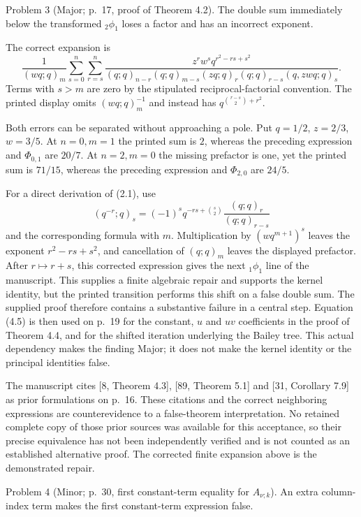 \documentclass[10pt]{article}
\begin{document}
Problem 3 (Major; p. 17, proof of Theorem 4.2).  The double sum immediately below the transformed \({}_2\phi_1\) loses a factor and has an incorrect exponent.\par
The correct expansion is \[\frac1{(wq;q)_m}
 \sum_{s=0}^n\sum_{r=s}^n
 \frac{z^r w^s q^{r^2-rs+s^2}}
 {(q;q)_{n-r}(q;q)_{m-s}(zq;q)_r
  (q;q)_{r-s}(q,zwq;q)_s}.
 \tag{2.1}\] Terms with \(s>m\) are zero by the stipulated reciprocal-factorial convention. The printed display omits \((wq;q)_m^{-1}\) and instead has \(q^{\binom{r-s}{2}+r^2}\).\par
Both errors can be separated without approaching a pole. Put \(q=1/2\), \(z=2/3\), \(w=3/5\). At \(n=0,m=1\) the printed sum is \(2\), whereas the preceding expression and \(\Phi_{0,1}\) are \(20/7\). At \(n=2,m=0\) the missing prefactor is one, yet the printed sum is \(71/15\), whereas the preceding expression and \(\Phi_{2,0}\) are \(24/5\).\par
For a direct derivation of (2.1), use \[(q^{-r};q)_s=(-1)^s q^{-rs+\binom s2}
              \frac{(q;q)_r}{(q;q)_{r-s}}\] and the corresponding formula with \(m\). Multiplication by \((wq^{m+1})^s\) leaves the exponent \(r^2-rs+s^2\), and cancellation of \((q;q)_m\) leaves the displayed prefactor. After \(r\mapsto r+s\), this corrected expression gives the next \({}_1\phi_1\) line of the manuscript. This supplies a finite algebraic repair and supports the kernel identity, but the printed transition performs this shift on a false double sum. The supplied proof therefore contains a substantive failure in a central step. Equation (4.5) is then used on p. 19 for the constant, \(u\) and \(uv\) coefficients in the proof of Theorem 4.4, and for the shifted iteration underlying the Bailey tree. This actual dependency makes the finding Major; it does not make the kernel identity or the principal identities false.\par
The manuscript cites [8, Theorem 4.3], [89, Theorem 5.1] and [31, Corollary 7.9] as prior formulations on p. 16. These citations and the correct neighboring expressions are counterevidence to a false-theorem interpretation. No retained complete copy of those prior sources was available for this acceptance, so their precise equivalence has not been independently verified and is not counted as an established alternative proof. The corrected finite expansion above is the demonstrated repair.\par
Problem 4 (Minor; p. 30, first constant-term equality for \(A_{\nu;k}\)).  An extra column-index term makes the first constant-term expression false.\par
\end{document}
